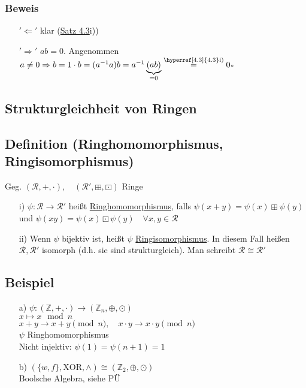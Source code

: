 \documentclass[12pt,titlepage, pdf]{article}
\newcommand{\uline}[1]{\underline{#1}}
\newcommand{\qed}{\hfill$\square$}
\renewcommand{\>}{\rightarrow}
\renewcommand{\*}{\cdot}
\begin{document}
\subsubsection*{Beweis}
\begin{itemize}
	\item[$'\Leftarrow'$] klar (\hyperref[4.3]{Satz 4.3}i))
	\item[$'\Rightarrow'$] $ab = 0$. Angenommen $a \neq 0 \Rightarrow b=1 \cdot b = (a^{-1}a)b = a^{-1}\underbrace{(ab)}_{= 0} \overset{\textrm{\hyperref[4.3]{4.3}i)}}{=} 0$\qed
\end{itemize}

\subsection*{Strukturgleichheit von Ringen}
\subsection{Definition (Ringhomomorphismus, Ringisomorphismus)}
Geg. $(\mathcal{R}, + , \cdot),\quad (\mathcal{R}', \boxplus, \boxdot)$  Ringe
\begin{itemize}
	\item[i)]$\psi: \mathcal{R} \rightarrow \mathcal{R}'$ heißt \uline{Ringhomomorphismus}, falls $\psi(x+y) = \psi(x) \boxplus \psi(y)$ und $\psi(xy)= \psi(x) \boxdot \psi(y)\quad \forall x,y \in \mathcal{R}$
	\item[ii)] Wenn $\psi$ bijektiv ist, heißt $\psi$ \uline{Ringisomorphismus}. In diesem Fall heißen $\mathcal{R}, \mathcal{R}'$ isomorph (d.h. sie sind strukturgleich). Man schreibt $\mathcal{R} \cong \mathcal{R}'$
\end{itemize}

\subsection{Beispiel}
\begin{itemize}
\item[a)] $\psi: (\mathbb{Z}, + ,\cdot) \rightarrow (\mathbb{Z}_n,\oplus, \odot)$\\
\noindent\hspace*{17mm}$x \mapsto x \mod n$\\
$x +y \rightarrow x+y \pmod{n},\quad x \cdot y \rightarrow x \cdot y \pmod{n}$\\
$\psi$ Ringhomomorphismus\\
Nicht injektiv: $\psi(1)=\psi(n+1)=1$
\item[b)]  $(\{w,f\}, \text{XOR}, \land) \cong (\mathbb{Z}_2, \oplus, \odot)$\\
 Boolsche Algebra, siehe PÜ
\end{itemize}
\end{document}
